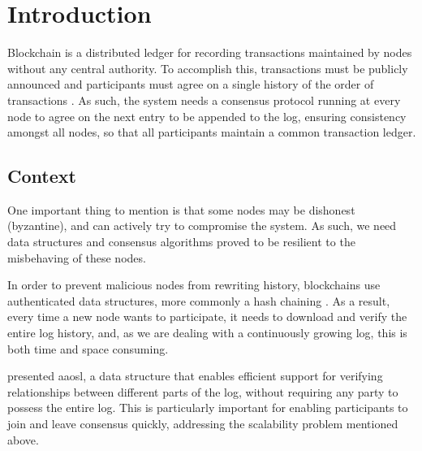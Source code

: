 \chapter{Introduction}

Blockchain is a distributed ledger for recording transactions maintained by nodes without any central authority. To accomplish this, transactions must be publicly announced and participants must agree on a single history of the order of transactions \citep{nakamoto}. As such, the system needs a consensus protocol running at every node to agree on the next entry to be appended to the log, ensuring consistency amongst all nodes, so that all participants maintain a common transaction ledger. 

\section{Context}
One important thing to mention is that some nodes may be dishonest (byzantine), and can actively try to compromise the system. As such, we need data structures and consensus algorithms proved to be resilient to the misbehaving of these nodes.


In order to prevent malicious nodes from rewriting history, blockchains use authenticated data structures, more commonly a hash chaining \citep{Spreitzer1999}. As a result, every time a new node wants to participate, it needs to download and verify the entire log history, and, as we are dealing with a continuously growing log, this is both time and space consuming.

\cite{skiplist} presented \gls{aaosl}, a data structure that enables efficient support for verifying relationships between different parts of the log, without requiring any party to possess the entire log. This is particularly important for enabling participants to join and leave consensus quickly, addressing the scalability problem mentioned above.


